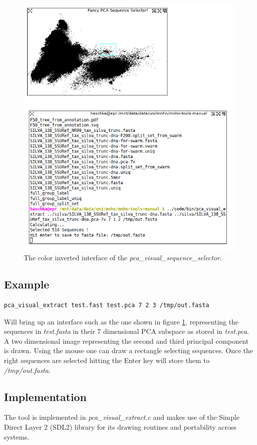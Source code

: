 \begin{figure}
  \begin{center}
    \includegraphics{pca-sequence-selector.png}
    \caption{The color inverted interface of the
      \emph{pca\_visual\_sequence\_selector}.}
    \label{fig-pcavisual}
  \end{center}
\end{figure}

\subsection{Example}
\begin{lstlisting}
pca_visual_extract test.fast test.pca 7 2 3 /tmp/out.fasta
\end{lstlisting}
Will bring up an interface such as the one shown in figure
\ref{fig-pcavisual}, representing the sequences in \emph{test.fasta} in
their 7 dimensional PCA subspace as stored in \emph{test.pca}. A two
dimensional image representing the second and third principal
component is drawn. Using the mouse one can draw a rectangle selecting
sequences. Once the right sequences are selected hitting the Enter key
will store them to \emph{/tmp/out.fasta}.

\subsection{Implementation}
The tool is implemented in \emph{pca\_visual\_extract.c} and makes use
of the Simple Direct Layer 2 (SDL2) library for its drawing routines
and portability across systems.

